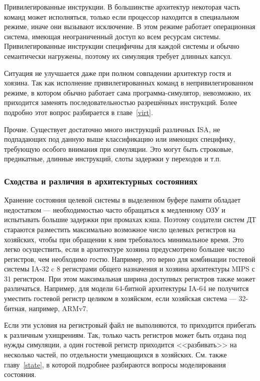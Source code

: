 \begin{description*}
    \item[Привилегированные инструкции.] В большинстве архитектур некоторая часть команд может исполняться, только если процессор находится в специальном режиме, иначе они вызывают исключение. В этом режиме работает операционная система, имеющая неограниченный доступ ко всем ресурсам системы. Привилегированные инструкции специфичны для каждой системы и обычно семантически нагружены, поэтому их симуляция требует длинных капсул.
    
    Ситуация не улучшается даже при полном совпадении архитектур гостя и хоязина. Так как исполнение привилегированных команд в непривилегированном режиме, в котором обычно работает сама программа-симулятор, невозможно, их приходится заменять последовательностью разрешённых инструкций. Более подробно этот вопрос разбирается в главе~\ref{virt}.

    \item[Прочие.] Существует достаточно много инструкций различных ISA, не подпадающих под данную выше классификацию или имеющих специфику, требующую особого внимания при симуляции. Это могут быть строковые, предикатные, длинные инструкций, слоты задержки у переходов и т.п.
\end{description*}


\subsubsection{Сходства и различия в архитектурных состояниях}

Хранение состояния целевой системы в выделенном буфере памяти обладает недостатком --- необходимостью часто обращаться к медленному ОЗУ и испытывать большие задержки при промахах кэша. Поэтому создатели систем ДТ стараются разместить максимально возможное число целевых регистров на хозяйских, чтобы при обращении к ним требовалось минимальное время. Это легко осуществить, если в архитектуре хозяина предусмотрено большее число регистров, чем необходимо гостю. Например, это верно для комбинации гостевой системы IA-32 c 8 регистрами общего назначения и хозяина архитектуры MIPS с 31 регистром. При этом максимальная ширина доступных регистров также может различаться. Например, для модели 64-битной архитектуры IA-64 не получится уместить гостевой регистр целиком в хозяйском, если хозяйская система --- 32-битная, например, ARMv7.

Если эти условия на регистровый файл не выполняются, то приходится прибегать к различным ухищрениям. Так, только часть регистров может быть отдана под нужды симуляции, а один гостевой регистр приходится <<разбивать>> на несколько частей, по отдельности умещающихся в хозяйских. См. также главу~\ref{state}, в которой подробнее разбираются вопросы моделирования состояния.

